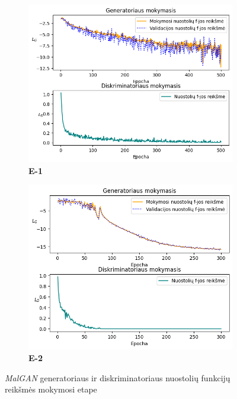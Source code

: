\begin{figure}[h]
    \begin{small}
        \begin{center}
            \begin{subfigure}[t]{0.5\textwidth}
                \centering
                \includegraphics[width=\textwidth]{img/learning_paper.png}
                \caption{\textbf{E-1}}\label{fig:experiment:learning:paper}
            \end{subfigure}
            \hfill
            \begin{subfigure}[t]{0.48\textwidth}
                \centering
                \includegraphics[width=\textwidth]{img/learning.png}
                \caption{\textbf{E-2}}\label{fig:experiment:learning}
            \end{subfigure}
        \end{center}
        \caption{\textit{MalGAN} generatoriaus ir diskriminatoriaus nuostolių funkcijų reikšmės mokymosi etape}\label{fig:experiment:learning:combined}
    \end{small}
\end{figure}

